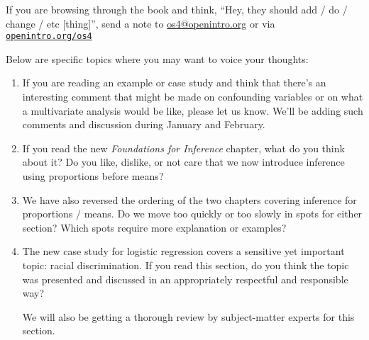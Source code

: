 \noindent%
If you are browsing through the book and think,
``Hey, they should add / do / change / etc [thing]'',
send a note to \url{os4@openintro.org}
or via
\href{http://www.openintro.org/os4}{\texttt{openintro.org/os4}}
\vspace{3mm}

\noindent%
Below are specific topics where you may
want to voice your thoughts:
\begin{enumerate}
\item
    If you are reading an example
    or case study and think that there's an
    interesting comment that might be made on
    confounding variables or on what a multivariate
    analysis would be like, please let us know.
    We'll be adding such comments and discussion
    during January and February.
\item
    If you read the new
    \emph{Foundations for Inference} chapter,
    what do you think about it?
    Do you like, dislike, or not care that we
    now introduce inference using proportions
    before means?
\item
    We have also reversed the ordering of the two chapters
    covering inference for proportions / means.
    Do we move too quickly or too slowly in spots
    for either section?
    Which spots require more explanation or examples?
\item
    The new case study for logistic regression
    covers a sensitive yet important topic:
    racial discrimination.
    If you read this section, do you think the
    topic was presented and discussed in an
    appropriately respectful and responsible way?

    We will also be getting a thorough
    review by subject-matter experts for this section.
    
\end{enumerate}


